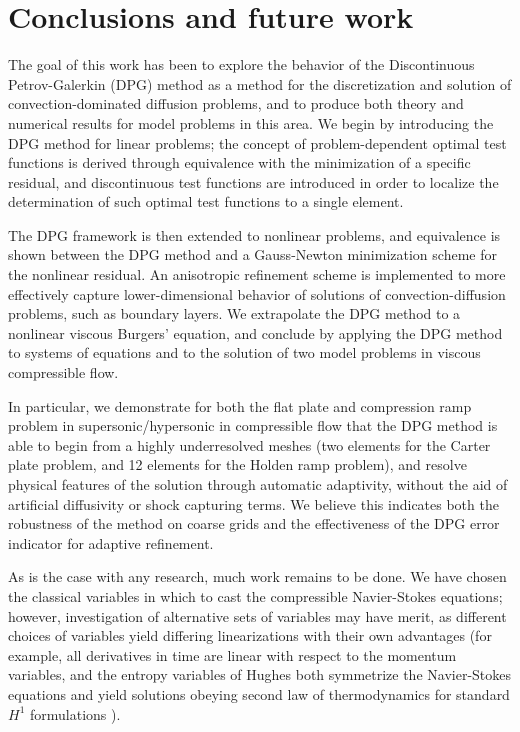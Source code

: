 \section{Conclusions and future work}

The goal of this work has been to explore the behavior of the Discontinuous Petrov-Galerkin (DPG) method as a method for the discretization and solution of convection-dominated diffusion problems, and to produce both theory and numerical results for model problems in this area.  We begin by introducing the DPG method for linear problems; the concept of problem-dependent optimal test functions is derived through equivalence with the minimization of a specific residual, and discontinuous test functions are introduced in order to localize the determination of such optimal test functions to a single element.  

The DPG framework is then extended to nonlinear problems, and equivalence is shown between the DPG method and a Gauss-Newton minimization scheme for the nonlinear residual.  An anisotropic refinement scheme is implemented to more effectively capture lower-dimensional behavior of solutions of convection-diffusion problems, such as boundary layers.  We extrapolate the DPG method to a nonlinear viscous Burgers' equation, and conclude by applying the DPG method to systems of equations and to the solution of two model problems in viscous compressible flow.  

In particular, we demonstrate for both the flat plate and compression ramp problem in supersonic/hypersonic in compressible flow that the DPG method is able to begin from a highly underresolved meshes (two elements for the Carter plate problem, and 12 elements for the Holden ramp problem), and resolve physical features of the solution through automatic adaptivity, without the aid of artificial diffusivity or shock capturing terms.  We believe this indicates both the robustness of the method on coarse grids and the effectiveness of the DPG error indicator for adaptive refinement.  

As is the case with any research, much work remains to be done.  We have chosen the classical variables in which to cast the compressible Navier-Stokes equations; however, investigation of alternative sets of variables may have merit, as different choices of variables yield differing linearizations with their own advantages (for example, all derivatives in time are linear with respect to the momentum variables, and the entropy variables of Hughes both symmetrize the Navier-Stokes equations and yield solutions obeying second law of thermodynamics for standard $H^1$ formulations \cite{Hughes1986223}).  

